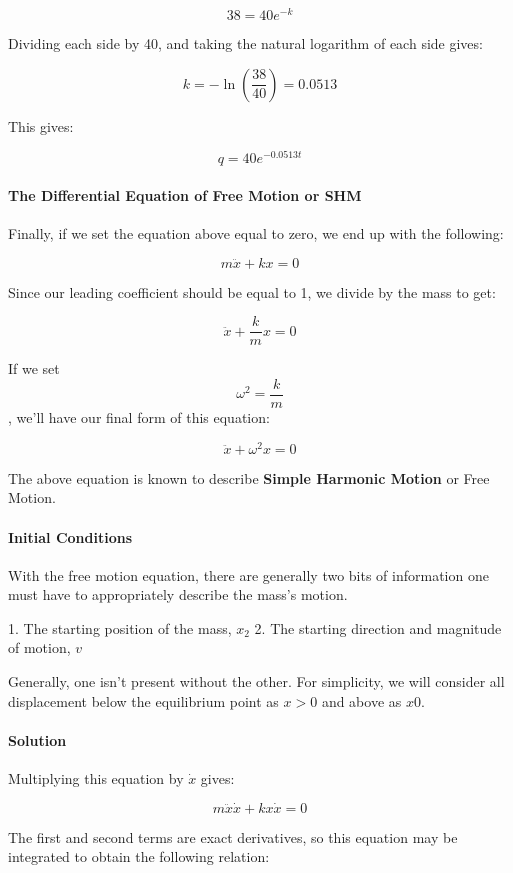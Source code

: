 $$38 = 40e^{-k}$$

Dividing each side by 40, and taking the natural logarithm of each side gives:

$$k = -\ln\left(\frac{38}{40}\right) = 0.0513$$

This gives:

$$q = 40e^{-0.0513t}$$

\paragraph{The Differential Equation of Free Motion or SHM}

Finally, if we set the equation above equal to zero, we end up with the following:

$$m\ddot{x} + kx = 0$$

Since our leading coefficient should be equal to 1, we divide by the mass to get:

$$\ddot{x} + \frac{k}{m}x = 0$$

If we set $$\omega^2 = \frac{k}{m}$$, we'll have our final form of this equation:

$$\ddot{x} + \omega^2x = 0$$

The above equation is known to describe \textbf{Simple Harmonic Motion} or Free Motion.

\paragraph{Initial Conditions}

With the free motion equation, there are generally two bits of information one must have to appropriately describe the mass's motion.

1. The starting position of the mass, $x_2$
2. The starting direction and magnitude of motion, $v$

Generally, one isn't present without the other. For simplicity, we will consider all displacement below the equilibrium point as $x>0$ and above as $x0$.

\paragraph{Solution}

Multiplying this equation by $\dot{x}$ gives:

$$m\ddot{x} \dot{x} + k x \dot{x} = 0$$

The first and second terms are exact derivatives, so this equation may be integrated to obtain the following relation:

